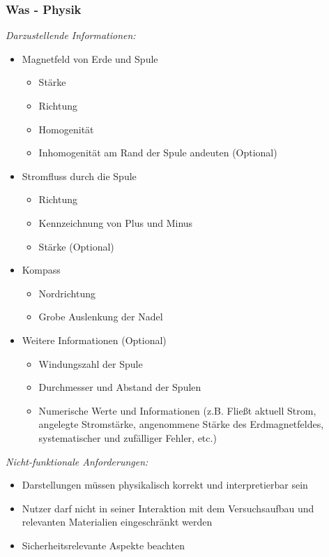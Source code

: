 \subsubsection{Was - Physik}

\textit{Darzustellende Informationen:}
\begin{itemize}
	\setlength{\itemsep}{-5pt}
	\item Magnetfeld von Erde und Spule
	\begin{itemize}[topsep=-0.25em]
		\setlength{\itemsep}{-0.25em}
		\item Stärke
		\item Richtung
		\item Homogenität
		\item Inhomogenität am Rand der Spule andeuten (Optional) 
	\end{itemize}
	\item Stromfluss durch die Spule
	\begin{itemize}[topsep=-0.25em]
		\setlength{\itemsep}{-0.25em}
		\item Richtung
		\item Kennzeichnung von Plus und Minus
		\item Stärke (Optional) 
	\end{itemize}
	\item Kompass
	\begin{itemize}[topsep=-0.25em]
		\setlength{\itemsep}{-0.25em}
		\item Nordrichtung
		\item Grobe Auslenkung der Nadel
	\end{itemize}
	\item Weitere Informationen (Optional)
	\begin{itemize}[topsep=-0.25em]
		\setlength{\itemsep}{-0.25em}
		\item Windungszahl der Spule
		\item Durchmesser und Abstand der Spulen
		\item Numerische Werte und Informationen (z.B. Fließt aktuell Strom, angelegte Stromstärke, angenommene Stärke des Erdmagnetfeldes, systematischer und zufälliger Fehler, etc.)
	\end{itemize}
\end{itemize}

\textit{Nicht-funktionale Anforderungen:}
\begin{itemize}
	\setlength{\itemsep}{-5pt}
	\item Darstellungen müssen physikalisch korrekt und interpretierbar sein
	\item Nutzer darf nicht in seiner Interaktion mit dem Versuchsaufbau und relevanten Materialien eingeschränkt werden
	\item Sicherheitsrelevante Aspekte beachten
\end{itemize}

